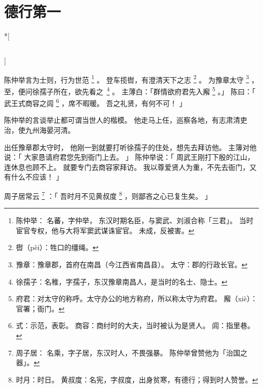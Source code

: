 
\chapter{德行第一}
\label{cha:de_xing_di_yi}

\begin{paracol}{2}

\switchcolumn[0]*[\section{}]

陈仲举言为士则，行为世范%
\footnote{%
    陈仲举：
    名蕃，字仲举，
    东汉时期名臣，与窦武、刘淑合称「三君」。
    当时宦官专权，他与大将军窦武谋诛宦官。
    未成，反被害。
}%
。
登车揽辔，有澄清天下之志%
\footnote{辔（pèi）：牲口的缰绳。}%
。
为豫章太守%
\footnote{%
    豫章：豫章郡，首府在南昌（今江西省南昌县）。
    太守：郡的行政长官。
}%
，
至，便问徐孺子所在，欲先看\mbox{之%
\footnote{徐孺子：名稚，字孺子，东汉豫章南昌人，是当时的名士、隐士。}}%
。
主薄白：「群情欲府君先入廨%
\footnote{%
    府君：对太守的称呼。太守办公的地方称府，所以称太守为府君。
    廨（xiè）：官署；衙门。
}%
。」
陈曰：「
    武王式商容之闾%
    \footnote{%
        式：示范，表彰。
        商容：商纣时的大夫，当时被认为是贤人。
        闾：指里巷。
    }%
    ，席不暇暖。
    吾之礼贤，有何不可！
」

\switchcolumn

陈仲举的言谈举止都可谓当世人的楷模。
他走马上任，巡察各地，有志肃清吏治，使九州海晏河清。

出任豫章郡太守时，
他刚一到就要打听徐孺子的住处，想先去拜访他。
主簿对他说：「
    大家恳请府君您先到衙门上去。
」
陈仲举说：「
    周武王刚打下殷的江山，
    连休息也顾不上。
    就要专门去商容家拜访。
    我以尊爱贤人为重，不先去衙门，又有什么不应该！
」


\switchcolumn*[\section{}]

周子居常云%
\footnote{%
    周子居：
    名乘，字子居，东汉时人，不畏强暴。
    陈仲举曾赞他为「治国之器」。
}%
：「
    吾时月不见黄叔度%
    \footnote{%
        时月：时日。
        黄叔度：名宪，字叔度，出身贫寒，有德行；得到时人赞誉。
    }%
    ，则鄙吝之心已复生矣。
」


\end{paracol}
